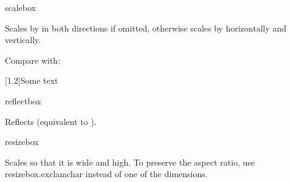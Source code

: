 \begin{definition}
\gls{scalebox}
\end{definition}
Scales  by  in both directions if  omitted, otherwise scales  by 
horizontally and  vertically.

\begin{codeS}
\end{codeS}
\begin{resultS}
\end{resultS}
Compare with:
\begin{codeS}
\end{codeS}
\begin{resultS}
\scalebox{0.8}[1.2]{Some text}
\end{resultS}

\begin{definition}
\gls{reflectbox}
\end{definition}
Reflects  (equivalent to ).

\begin{codeS}
\end{codeS}
\begin{resultS}
\end{resultS}

\begin{definition}
\gls{resizebox}
\end{definition}
Scales  so that it is  wide and  high. To preserve the aspect ratio, use \gls{resizebox.exclamchar}
instead of one of the dimensions.

\begin{code}
\begin{alltt}
\marg{12mm}\marg{1cm}
\marg{1cm}
\end{alltt}
\end{code}%
\begin{resultS}
\end{resultS}

